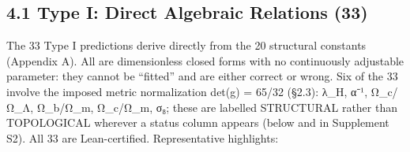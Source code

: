 \documentclass[11pt,a4paper]{article}
\begin{document}
\subsection{4.1 Type I: Direct Algebraic Relations (33)}\label{type-i-direct-algebraic-relations-33}

The 33 Type I predictions derive directly from the 20 structural constants (Appendix A). All are dimensionless closed forms with no continuously adjustable parameter: they cannot be ``fitted'' and are either correct or wrong. Six of the 33 involve the imposed metric normalization det(g) = 65/32 (§2.3): λ\_\allowbreak{}H, α⁻¹, Ω\_\allowbreak{}c/Ω\_\allowbreak{}Λ, Ω\_\allowbreak{}b/Ω\_\allowbreak{}m, Ω\_\allowbreak{}c/Ω\_\allowbreak{}m, σ₈; these are labelled STRUCTURAL rather than TOPOLOGICAL wherever a status column appears (below and in Supplement S2). All 33 are Lean-certified. Representative highlights:
\end{document}
